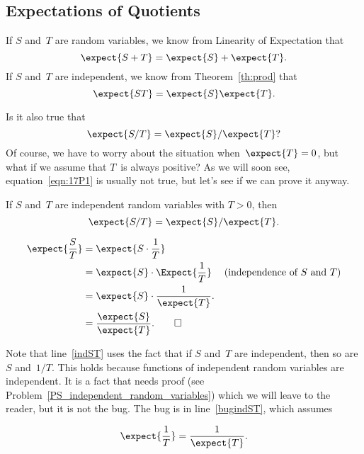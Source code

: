 \begin{editingnotes}
\section{Expectations of Quotients}

If $S$ and~$T$ are random variables, we know from Linearity of
Expectation that
\begin{equation*}
    \expect{S + T} = \expect{S} + \expect{T}.
\end{equation*}
If $S$ and~$T$ are independent, we know from Theorem~\ref{th:prod}
that
\begin{equation*}
    \expect{ST} = \expect{S} \expect{T}.
\end{equation*}

Is it also true that
\begin{equation}\label{eqn:17P1}
    \expect{S/T} = \expect{S}/\expect{T}?
\end{equation}
Of course, we have to worry about the situation when~$\expect{T} = 0$,
but what if we assume that $T$~is always positive?  As we will soon
see, equation~\eqref{eqn:17P1} is usually not true, but let's see if we
can prove it anyway.

\begin{falseclm}\label{fc:17P2}
If $S$ and~$T$ are independent random variables with $T > 0$, then
\begin{equation}
    \expect{S/T} = \expect{S}/\expect{T}.
\end{equation}
\end{falseclm}

\begin{bogusproof}
\begin{align}
\expect{\frac{S}{T}} & = \expect{S \cdot \frac{1}{T}} \notag\\
       & = \expect{S} \cdot \Expect{\frac{1}{T}} & \text{(independence of $S$
       and $T$)}\label{indST}\\
      & = \expect{S} \cdot \frac{1}{\expect{T}}. \label{bugindST}\\
      & = \frac{\expect{S}}{\expect{T}}.\notag \qedhere
\end{align}
\end{bogusproof}
Note that line~\ref{indST} uses the fact that if $S$ and~$T$ are
independent, then so are $S$ and~$1/T$.  This holds because functions
of independent random variables are independent.  It is a fact that
needs proof (see Problem~\ref{PS_independent_random_variables}) which
we will leave to the reader, but it is not the bug.  The bug is in
line~\eqref{bugindST}, which assumes
\begin{falseclm}\label{false-inverse}
\[
\expect{\frac{1}{T}} =  \frac{1}{\expect{T}}.
\]
\end{falseclm}


\end{editingnotes}
